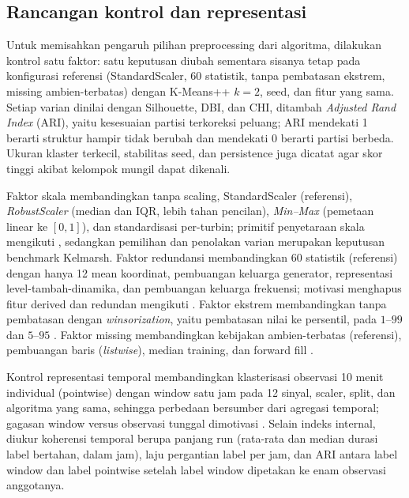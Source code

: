 \subsection{Rancangan kontrol dan representasi}
Untuk memisahkan pengaruh pilihan preprocessing dari algoritma, dilakukan kontrol satu faktor: satu keputusan diubah sementara sisanya tetap pada konfigurasi referensi (StandardScaler, 60 statistik, tanpa pembatasan ekstrem, missing ambien-terbatas) dengan K-Means++ $k=2$, seed, dan fitur yang sama. Setiap varian dinilai dengan Silhouette, DBI, dan CHI, ditambah \textit{Adjusted Rand Index} (ARI), yaitu kesesuaian partisi terkoreksi peluang; ARI mendekati 1 berarti struktur hampir tidak berubah dan mendekati 0 berarti partisi berbeda. Ukuran klaster terkecil, stabilitas seed, dan persistence juga dicatat agar skor tinggi akibat kelompok mungil dapat dikenali.

Faktor skala membandingkan tanpa scaling, StandardScaler (referensi), \textit{RobustScaler} (median dan IQR, lebih tahan pencilan), \textit{Min--Max} (pemetaan linear ke $[0,1]$), dan standardisasi per-turbin; primitif penyetaraan skala mengikuti \cite{mazgula2024,li2026,bette2023}, sedangkan pemilihan dan penolakan varian merupakan keputusan benchmark Kelmarsh. Faktor redundansi membandingkan 60 statistik (referensi) dengan hanya 12 mean koordinat, pembuangan keluarga generator, representasi level-tambah-dinamika, dan pembuangan keluarga frekuensi; motivasi menghapus fitur derived dan redundan mengikuti \cite{bonifati2022,li2026,bette2023}. Faktor ekstrem membandingkan tanpa pembatasan dengan \textit{winsorization}, yaitu pembatasan nilai ke persentil, pada $1$--$99$ dan $5$--$95$ \cite{cai2025,belhadj2026}. Faktor missing membandingkan kebijakan ambien-terbatas (referensi), pembuangan baris (\textit{listwise}), median training, dan forward fill \cite{bonifati2022,cai2025,ghaderi2023}.

Kontrol representasi temporal membandingkan klasterisasi observasi 10 menit individual (pointwise) dengan window satu jam pada 12 sinyal, scaler, split, dan algoritma yang sama, sehingga perbedaan bersumber dari agregasi temporal; gagasan window versus observasi tunggal dimotivasi \cite{martipuig2024,draayer2026,lang2026}. Selain indeks internal, diukur koherensi temporal berupa panjang run (rata-rata dan median durasi label bertahan, dalam jam), laju pergantian label per jam, dan ARI antara label window dan label pointwise setelah label window dipetakan ke enam observasi anggotanya.


